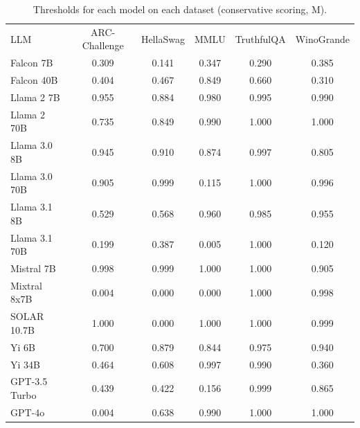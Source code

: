 \begin{table}[h]
\caption{Thresholds for each model on each dataset (conservative scoring, M). }
\label{tab:thresholds_prob_margin_k20_w2}
\centering
\begin{tabular}{l S[table-format=3.1] S[table-format=3.1] S[table-format=3.1] S[table-format=3.1] S[table-format=3.1]}
\toprule
LLM & ARC-Challenge & HellaSwag & MMLU & TruthfulQA & WinoGrande \\ 
\cmidrule(lr){1-1} \cmidrule(lr){2-2} \cmidrule(lr){3-3} \cmidrule(lr){4-4} \cmidrule(lr){5-5} \cmidrule(lr){6-6}
Falcon 7B & 0.309 & 0.141 & 0.347 & 0.290 & 0.385\\
Falcon 40B & 0.404 & 0.467 & 0.849 & 0.660 & 0.310\\
Llama 2 7B & 0.955 & 0.884 & 0.980 & 0.995 & 0.990\\
Llama 2 70B & 0.735 & 0.849 & 0.990 & 1.000 & 1.000\\
Llama 3.0 8B & 0.945 & 0.910 & 0.874 & 0.997 & 0.805\\
Llama 3.0 70B & 0.905 & 0.999 & 0.115 & 1.000 & 0.996\\
Llama 3.1 8B & 0.529 & 0.568 & 0.960 & 0.985 & 0.955\\
Llama 3.1 70B & 0.199 & 0.387 & 0.005 & 1.000 & 0.120\\
Mistral 7B & 0.998 & 0.999 & 1.000 & 1.000 & 0.905\\
Mixtral 8x7B & 0.004 & 0.000 & 0.000 & 1.000 & 0.998\\
SOLAR 10.7B & 1.000 & 0.000 & 1.000 & 1.000 & 0.999\\
Yi 6B & 0.700 & 0.879 & 0.844 & 0.975 & 0.940\\
Yi 34B & 0.464 & 0.608 & 0.997 & 0.990 & 0.360\\
GPT-3.5 Turbo & 0.439 & 0.422 & 0.156 & 0.999 & 0.865\\
GPT-4o & 0.004 & 0.638 & 0.990 & 1.000 & 1.000\\
\bottomrule
\end{tabular}
\end{table}
